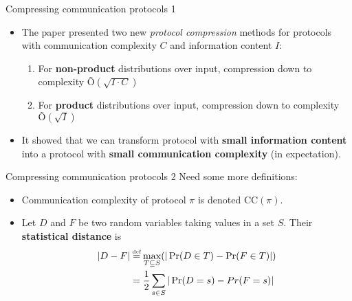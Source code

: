 \documentclass[10pt]{beamer}
\newcommand\CC{\textrm{CC}}
\newcommand\defeq{\mathrel{\stackrel{\makebox[0pt]{\mbox{\normalfont\tiny def}}}{=}}}
\begin{document}
\begin{frame}{Compressing communication protocols 1}
\begin{itemize}
    \item The paper presented two new \textit{protocol compression} methods for protocols with communication complexity $C$ and information content $I$:
    \begin{enumerate}
        \pause
        \vskip 0.3cm
        \item For \textbf{non-product} distributions over input, compression down to complexity $Õ(\sqrt{I\cdot C})$
        \vskip 0.3cm
            \pause
        \item For \textbf{product} distributions over input, compression down to complexity $Õ(\sqrt{I})$
    \end{enumerate}
    \vskip 0.3cm
        \pause
    \item It showed that we can transform protocol with \textbf{small information content} into a protocol with \textbf{small communication complexity} (in expectation). 
    
\end{itemize}
\end{frame}

\begin{frame}{Compressing communication protocols 2}
Need some more definitions:
\begin{itemize}
    \vskip 0.5cm
        \pause
    \item Communication complexity of protocol $\pi$ is denoted $\CC(\pi)$.
    \vskip 0.5cm
        \pause
    \item Let $D$ and $F$ be two random variables taking values in a set $S$. Their \textbf{statistical distance} is
    \begin{align*}
    |D - F| &\defeq \max_{T \subseteq S} (| \Pr(D \in T) - \Pr(F \in T) |)
    \\ &= \frac{1}{2} \sum_{s \in S} | \Pr(D = s) - Pr(F = s)|
    \end{align*}
    
\end{itemize}
\end{frame}
\end{document}
